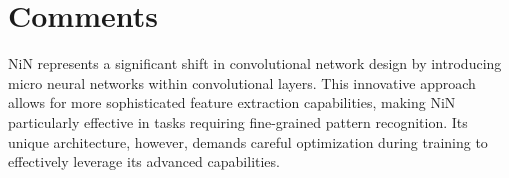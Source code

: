 \section{Comments}
NiN represents a significant shift in convolutional network design by introducing micro neural networks within convolutional layers. This innovative approach allows for more sophisticated feature extraction capabilities, making NiN particularly effective in tasks requiring fine-grained pattern recognition. Its unique architecture, however, demands careful optimization during training to effectively leverage its advanced capabilities.